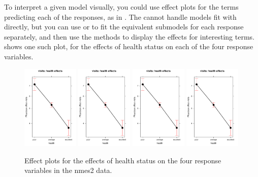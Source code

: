 \documentclass[11pt]{book}\usepackage[]{graphicx}\usepackage[]{color}
\begin{document}
To interpret a given model visually, you could use effect plots for the terms predicting each of
the responses, as in .  The  cannot handle models fit with
 directly, but you can use  or  to fit the equivalent
submodels for each response separately, and then use the  methods
to display the effects for interesting terms.  shows one such
plot, for the effects of health status on each of the four response variables.

\begin{figure}[htb]
  \includegraphics[page=1, width=0.24\textwidth, clip]{ch09/fig/nmes-eff-health.pdf}
  \includegraphics[page=2, width=0.24\textwidth, clip]{ch09/fig/nmes-eff-health.pdf}
  \includegraphics[page=3, width=0.24\textwidth, clip]{ch09/fig/nmes-eff-health.pdf}
  \includegraphics[page=4, width=0.24\textwidth, clip]{ch09/fig/nmes-eff-health.pdf}
  \caption{Effect plots for the effects of health status on the four response variables in the nmes2 data.}
  \label{fig:nmes-eff-health}
\end{figure}
\end{document}
